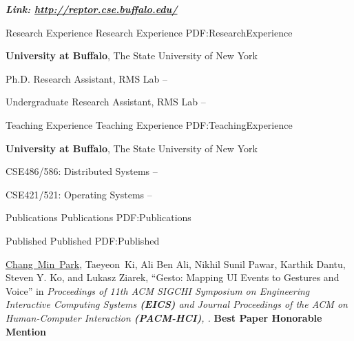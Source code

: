 \documentclass[letterpaper,MMMyyyy,nonstopmode]{simpleresumecv}
\begin{document}
\begin{Body}
\hspace{2ex}
\textbf{\textit{Link: \href{http://reptor.cse.buffalo.edu/}{http://reptor.cse.buffalo.edu/}}}
\hfill




\Section
{Research Experience}
{Research Experience}
{PDF:ResearchExperience}

\Entry
\textbf{University at Buffalo}, The State University of New York

\Gap
\BulletItem
Ph.D. Research Assistant, RMS Lab
\hfill
{} --

\Gap
\BulletItem
Undergraduate Research Assistant, RMS Lab
\hfill
{} --


\vspace{-1ex}
\Section
{Teaching Experience}
{Teaching Experience}
{PDF:TeachingExperience}

\Entry
\textbf{University at Buffalo}, The State University of New York

\Gap
\BulletItem
CSE486/586: Distributed Systems
\hfill
{} --

\Gap
\BulletItem
CSE421/521: Operating Systems
\hfill
{} --



\vspace{-1ex}
\Section
{Publications}
{Publications}
{PDF:Publications}

\SubSection
{Published}
{Published}
{PDF:Published}

\begingroup
\renewcommand{\MaxNumberedItem}{[88]}

\BigGap
\NumberedItem{[1]} 
\underline{Chang~Min~Park}, Taeyeon~Ki, Ali Ben Ali, 
Nikhil Sunil Pawar, Karthik Dantu, Steven Y. Ko, and Lukasz Ziarek, 
``Gesto: Mapping UI Events to Gestures and Voice'' in
\textit{Proceedings of 11th ACM SIGCHI Symposium on Engineering Interactive Computing Systems \textbf{(EICS)}
and \textit{Journal Proceedings of the ACM on Human-Computer Interaction \textbf{(PACM-HCI)}}, .}
\linebreak\textbf{Best Paper Honorable Mention}


\end{Body}
\end{document}
